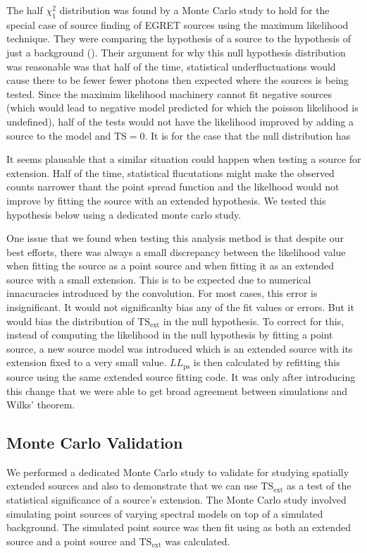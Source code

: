 \documentclass[12pt,preprint]{aastex}
\newcommand{\tsext}{{\ensuremath{\text{TS}_\text{ext}}}\xspace}
\newcommand{\ts}{\text{TS}\xspace}
\newcommand{\pointlike}{\text{\em pointlike}\xspace}
\begin{document}
The half $\chi^2_1$ distribution was found by a Monte Carlo study
to hold for the special case of source finding of EGRET sources using the
maximum likelihood technique.  They were comparing the hypothesis of a
source to the hypothesis of just a background (\cite{mattox_egret}).
Their argument for why this null hypothesis distribution was reasonable
was that half of the time, statistical underfluctuations would cause
there to be fewer fewer photons then expected where the sources is being
tested. Since the maximim likelihood machinery cannot fit negative
sources (which would lead to negative model predicted for which the
poisson likelihood is undefined), half of the tests would not have the
likelihood improved by adding a source to the model and $\ts=0$.
It is for the case that the null distribution has 

It seems plausable that a similar situation could happen when testing
a source for extension. Half of the time, statistical flucutations might
make the observed counts narrower thant the point spread function and
the likelhood would not improve by fitting the source with an extended
hypothesis. We tested this hypothesis below using a dedicated monte
carlo study.

One issue that we found when testing this analysis method is that
despite our best efforts, there was always a small discrepancy between
the likelihood value when fitting the source as a point source and when
fitting it as an extended source with a small extension.  This is to be
expected due to numerical innacuracies introduced by the convolution.
For most cases, this error is insignificant. It would not significanlty
bias any of the fit values or errors. But it would bias the distribution
of $\tsext$ in the null hypothesis. To correct for this,
instead of computing the likelihood in the null hypothesis by fitting
a point source, a new source model was introduced which is an extended
source with its extension fixed to a very small value. $LL_\text{ps}$
is then calculated by refitting this source using the same extended
source fitting code. It was only after introducing this change that we
were able to get broad agreement between simulations and Wilks' theorem.


\subsection{Monte Carlo Validation} \label{monte_carlo_validation}

We performed a dedicated Monte Carlo study to validate \pointlike for
studying spatially extended sources and also to demonstrate that we can
use $\tsext$ as a test of the statistical significance
of a source's extension.  The Monte Carlo study involved simulating point
sources of varying spectral models on top of a simulated background. The
simulated point source was then fit using \pointlike as both an extended
source and a point source and $\tsext$ was calculated.
\end{document}
